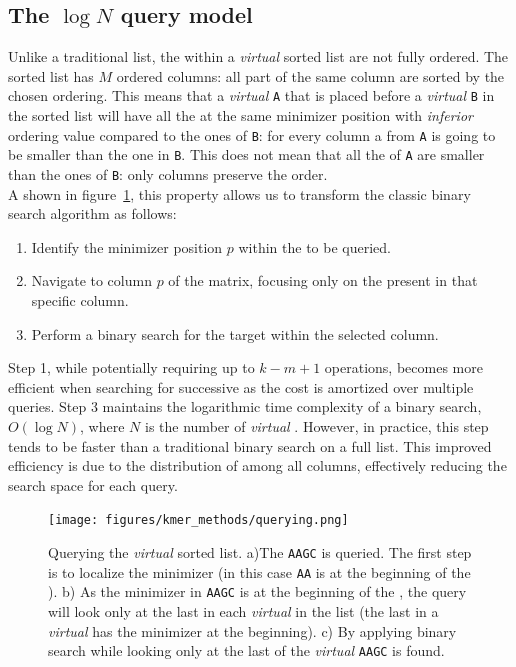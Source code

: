 \subsection{The $\log{N}$ query model}
\label{sec:logN_model}
Unlike a traditional \kmer list, the \kmers within a \emph{virtual} \skmer sorted list are not fully ordered. The sorted list has $M$ ordered columns: all \kmers part of the same column are sorted by the chosen ordering. This means that a \emph{virtual} \skmer \texttt{A} that is placed before a \emph{virtual} \skmer \texttt{B} in the sorted list will have all the \kmers at the same minimizer position with \emph{inferior} ordering value compared to the ones of \texttt{B}: for every column a \kmer from \texttt{A} is going to be smaller than the one in \texttt{B}. This does not mean that all the \kmers of \texttt{A} are smaller than the ones of \texttt{B}: only columns preserve the order.\\
A shown in figure~\ref{fig:skmer_query}, this property allows us to transform the classic binary search algorithm as follows:
\begin{enumerate}
	\item Identify the minimizer position $p$ within the \kmer to be queried.
	\item Navigate to column $p$ of the matrix, focusing only on the \kmers present in that specific column.
	\item Perform a binary search for the target \kmer within the selected column.
\end{enumerate}
Step 1, while potentially requiring up to $k-m+1$ operations, becomes more efficient when searching for successive \kmers as the cost is amortized over multiple queries.
Step 3 maintains the logarithmic time complexity of a binary search, $O(\log N)$, where $N$ is the number of \emph{virtual} \skmers. However, in practice, this step tends to be faster than a traditional binary search on a full \kmer list. This improved efficiency is due to the distribution of \kmers among all columns, effectively reducing the search space for each query.
\begin{figure}[H]
	\centering
	\texttt{[image: figures/kmer\_methods/querying.png]}
	\caption[Querying the \emph{virtual} \skmer sorted list.]{Querying the \emph{virtual} \skmer sorted list. a)The \texttt{AAGC} \kmer is queried. The first step is to localize the minimizer (in this case \texttt{AA} is at the beginning of the \kmer). b) As the minimizer in \texttt{AAGC} is at the beginning of the \kmer, the query will look only at the last \kmer in each \emph{virtual} \skmer in the list (the last \kmer in a \emph{virtual} \skmer has the minimizer at the beginning). c) By applying binary search while looking only at the last \kmers of the \emph{virtual} \skmers \texttt{AAGC} is found.}
	\label{fig:skmer_query}
\end{figure}

